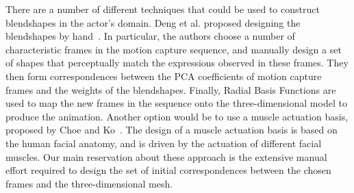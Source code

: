 \documentclass[11pt]{report}
\begin{document}
There are a number of different techniques that could be used to construct blendshapes in the actor's domain. Deng et al. proposed designing the blendshapes by hand~\cite{Deng:2006}. In particular, the authors choose a number of characteristic frames in the motion capture sequence, and manually design a set of shapes that perceptually match the expressions observed in these frames. They then form correspondences between the PCA coefficients of motion capture frames and the weights of the blendshapes. Finally, Radial Basis Functions are used to map the new frames in the sequence onto the three-dimensional model to produce the animation. Another option would be to use a muscle actuation basis, proposed by Choe and Ko~\cite{Choe:2005}. The design of a muscle actuation basis is based on the human facial anatomy, and is driven by the actuation of different facial muscles. Our main reservation about these approach is the extensive manual effort required to design the set of initial correspondences between the chosen frames and the three-dimensional mesh.


\newpage


\end{document}
